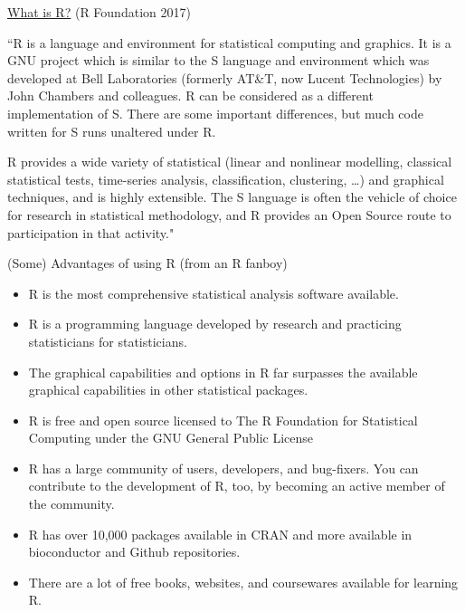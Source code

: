 \begin{frame}{\href{https://www.r-project.org/about.html}{What is R?} (R
Foundation 2017)}

``R is a language and environment for statistical computing and
graphics. It is a GNU project which is similar to the S language and
environment which was developed at Bell Laboratories (formerly AT\&T,
now Lucent Technologies) by John Chambers and colleagues. R can be
considered as a different implementation of S. There are some important
differences, but much code written for S runs unaltered under R.

R provides a wide variety of statistical (linear and nonlinear
modelling, classical statistical tests, time-series analysis,
classification, clustering, \ldots{}) and graphical techniques, and is
highly extensible. The S language is often the vehicle of choice for
research in statistical methodology, and R provides an Open Source route
to participation in that activity."

\end{frame}

\begin{frame}{(Some) Advantages of using R (from an R fanboy)}

\begin{itemize}
\tightlist
\item
  R is the most comprehensive statistical analysis software available.
\item
  R is a programming language developed by research and practicing
  statisticians for statisticians.
\item
  The graphical capabilities and options in R far surpasses the
  available graphical capabilities in other statistical packages.
\item
  R is free and open source licensed to The R Foundation for Statistical
  Computing under the GNU General Public License
\item
  R has a large community of users, developers, and bug-fixers. You can
  contribute to the development of R, too, by becoming an active member
  of the community.
\item
  R has over 10,000 packages available in CRAN and more available in
  bioconductor and Github repositories.
\item
  There are a lot of free books, websites, and coursewares available for
  learning R.
\end{itemize}

\end{frame}


